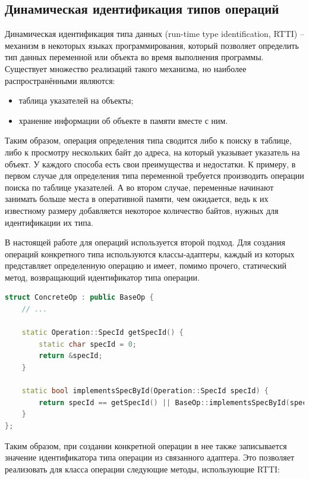 \subsection{Динамическая идентификация типов операций}
\label{sec:optree_rtti}

Динамическая идентификация типа данных (run-time type identification, RTTI) -- механизм в некоторых языках программирования, который позволяет определить тип данных переменной или объекта во время выполнения программы.
Существует множество реализаций такого механизма, но наиболее распространёнными являются:

\begin{itemize}
    \item таблица указателей на объекты;
    \item хранение информации об объекте в памяти вместе с ним.
\end{itemize}

Таким образом, операция определения типа сводится либо к поиску в таблице, либо к просмотру нескольких байт до адреса, на который указывает указатель на объект.
У каждого способа есть свои преимущества и недостатки.
К примеру, в первом случае для определения типа переменной требуется производить операции поиска по таблице указателей.
А во втором случае, переменные начинают занимать больше места в оперативной памяти, чем ожидается, ведь к их известному размеру добавляется некоторое количество байтов, нужных для идентификации их типа.

В настоящей работе для операций используется второй подход.
Для создания операций конкретного типа используются классы-адаптеры, каждый из которых представляет определенную операцию и имеет, помимо прочего, статический метод, возвращающий идентификатор типа операции.

\begin{lstlisting}[language=C++, caption=Фрагмент реализации RTTI]
struct ConcreteOp : public BaseOp {
    // ...

    static Operation::SpecId getSpecId() {
        static char specId = 0;
        return &specId;
    }

    static bool implementsSpecById(Operation::SpecId specId) {
        return specId == getSpecId() || BaseOp::implementsSpecById(specId);
    }
};
\end{lstlisting}

Таким образом, при создании конкретной операции в нее также записывается значение идентификатора типа операции из связанного адаптера.
Это позволяет реализовать для класса операции следующие методы, использующие RTTI:

